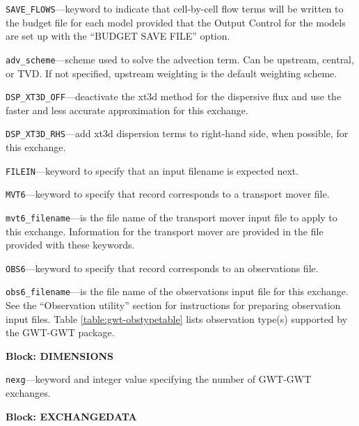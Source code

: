 \begin{description}
\item \texttt{SAVE\_FLOWS}---keyword to indicate that cell-by-cell flow terms will be written to the budget file for each model provided that the Output Control for the models are set up with the ``BUDGET SAVE FILE'' option.

\item \texttt{adv\_scheme}---scheme used to solve the advection term.  Can be upstream, central, or TVD.  If not specified, upstream weighting is the default weighting scheme.

\item \texttt{DSP\_XT3D\_OFF}---deactivate the xt3d method for the dispersive flux and use the faster and less accurate approximation for this exchange.

\item \texttt{DSP\_XT3D\_RHS}---add xt3d dispersion terms to right-hand side, when possible, for this exchange.

\item \texttt{FILEIN}---keyword to specify that an input filename is expected next.

\item \texttt{MVT6}---keyword to specify that record corresponds to a transport mover file.

\item \texttt{mvt6\_filename}---is the file name of the transport mover input file to apply to this exchange.  Information for the transport mover are provided in the file provided with these keywords.

\item \texttt{OBS6}---keyword to specify that record corresponds to an observations file.

\item \texttt{obs6\_filename}---is the file name of the observations input file for this exchange. See the ``Observation utility'' section for instructions for preparing observation input files. Table \ref{table:gwt-obstypetable} lists observation type(s) supported by the GWT-GWT package.

\end{description}
\item \textbf{Block: DIMENSIONS}

\begin{description}
\item \texttt{nexg}---keyword and integer value specifying the number of GWT-GWT exchanges.

\end{description}
\item \textbf{Block: EXCHANGEDATA}

